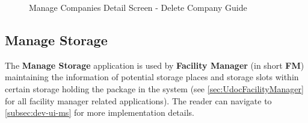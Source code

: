 \bigskip
\begin{figure}[htb!]
	\centering
  
    \vspace{10pt}
    \caption{Manage Companies Detail Screen - Delete Company Guide}
	\label{fig:MCDetailDeleteGuide}
\end{figure}



\subsection{Manage Storage}
\label{subsec:ms}

The \textbf{Manage Storage} application is used by \textbf{Facility Manager} (in short \textbf{FM}) maintaining the information of potential storage places and storage slots within certain storage holding the package in the system (see \autoref{sec:UdocFacilityManager} for all facility manager related applications). The reader can navigate to \autoref{subsec:dev-ui-ms} for more implementation details. 

